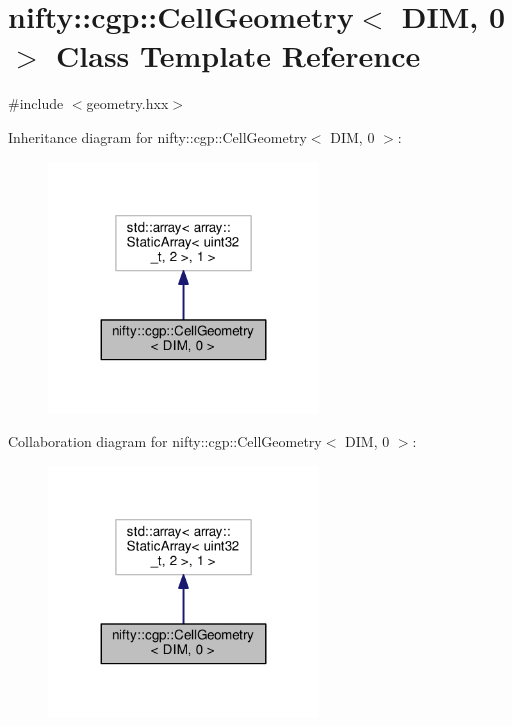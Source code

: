 \hypertarget{classnifty_1_1cgp_1_1CellGeometry_3_01DIM_00_010_01_4}{}\section{nifty\+:\+:cgp\+:\+:Cell\+Geometry$<$ D\+I\+M, 0 $>$ Class Template Reference}
\label{classnifty_1_1cgp_1_1CellGeometry_3_01DIM_00_010_01_4}


{\ttfamily \#include $<$geometry.\+hxx$>$}



Inheritance diagram for nifty\+:\+:cgp\+:\+:Cell\+Geometry$<$ D\+I\+M, 0 $>$\+:\nopagebreak
\begin{figure}[H]
\begin{center}
\leavevmode
\includegraphics[width=203pt]{classnifty_1_1cgp_1_1CellGeometry_3_01DIM_00_010_01_4__inherit__graph}
\end{center}
\end{figure}


Collaboration diagram for nifty\+:\+:cgp\+:\+:Cell\+Geometry$<$ D\+I\+M, 0 $>$\+:\nopagebreak
\begin{figure}[H]
\begin{center}
\leavevmode
\includegraphics[width=203pt]{classnifty_1_1cgp_1_1CellGeometry_3_01DIM_00_010_01_4__coll__graph}
\end{center}
\end{figure}

